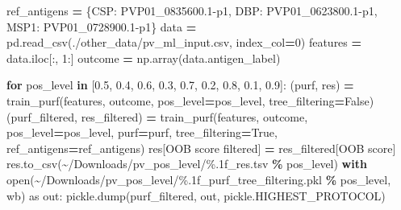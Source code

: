 \documentclass[
  11pt,
  oneside]{book}
\newenvironment{Shaded}{\begin{snugshade}}{\end{snugshade}}
\newcommand{\BuiltInTok}[1]{#1}
\newcommand{\ControlFlowTok}[1]{\textcolor[rgb]{0.13,0.29,0.53}{\textbf{#1}}}
\newcommand{\DecValTok}[1]{\textcolor[rgb]{0.00,0.00,0.81}{#1}}
\newcommand{\FloatTok}[1]{\textcolor[rgb]{0.00,0.00,0.81}{#1}}
\newcommand{\ImportTok}[1]{#1}
\newcommand{\KeywordTok}[1]{\textcolor[rgb]{0.13,0.29,0.53}{\textbf{#1}}}
\newcommand{\NormalTok}[1]{#1}
\newcommand{\OperatorTok}[1]{\textcolor[rgb]{0.81,0.36,0.00}{\textbf{#1}}}
\newcommand{\SpecialCharTok}[1]{\textcolor[rgb]{0.00,0.00,0.00}{#1}}
\newcommand{\StringTok}[1]{\textcolor[rgb]{0.31,0.60,0.02}{#1}}
\newcommand{\VariableTok}[1]{\textcolor[rgb]{0.00,0.00,0.00}{#1}}
\begin{document}
\begin{Shaded}
\begin{Highlighting}[]
\NormalTok{ref\_antigens }\OperatorTok{=}\NormalTok{ \{}\StringTok{\textquotesingle{}CSP\textquotesingle{}}\NormalTok{: }\StringTok{\textquotesingle{}PVP01\_0835600.1{-}p1\textquotesingle{}}\NormalTok{, }\StringTok{\textquotesingle{}DBP\textquotesingle{}}\NormalTok{: }\StringTok{\textquotesingle{}PVP01\_0623800.1{-}p1\textquotesingle{}}\NormalTok{, }\StringTok{\textquotesingle{}MSP1\textquotesingle{}}\NormalTok{: }\StringTok{\textquotesingle{}PVP01\_0728900.1{-}p1\textquotesingle{}}\NormalTok{\}}
\NormalTok{data }\OperatorTok{=}\NormalTok{ pd.read\_csv(}\StringTok{\textquotesingle{}./other\_data/pv\_ml\_input.csv\textquotesingle{}}\NormalTok{, index\_col}\OperatorTok{=}\DecValTok{0}\NormalTok{)}
\NormalTok{features }\OperatorTok{=}\NormalTok{ data.iloc[:, }\DecValTok{1}\NormalTok{:]}
\NormalTok{outcome }\OperatorTok{=}\NormalTok{ np.array(data.antigen\_label)}

\ControlFlowTok{for}\NormalTok{ pos\_level }\KeywordTok{in}\NormalTok{ [}\FloatTok{0.5}\NormalTok{, }\FloatTok{0.4}\NormalTok{, }\FloatTok{0.6}\NormalTok{, }\FloatTok{0.3}\NormalTok{, }\FloatTok{0.7}\NormalTok{, }\FloatTok{0.2}\NormalTok{, }\FloatTok{0.8}\NormalTok{, }\FloatTok{0.1}\NormalTok{, }\FloatTok{0.9}\NormalTok{]:}
\NormalTok{    (purf, res) }\OperatorTok{=}\NormalTok{ train\_purf(features, outcome, pos\_level}\OperatorTok{=}\NormalTok{pos\_level, tree\_filtering}\OperatorTok{=}\VariableTok{False}\NormalTok{)}
\NormalTok{    (purf\_filtered, res\_filtered) }\OperatorTok{=}\NormalTok{ train\_purf(features, outcome, pos\_level}\OperatorTok{=}\NormalTok{pos\_level, purf}\OperatorTok{=}\NormalTok{purf, tree\_filtering}\OperatorTok{=}\VariableTok{True}\NormalTok{, ref\_antigens}\OperatorTok{=}\NormalTok{ref\_antigens)}
\NormalTok{    res[}\StringTok{\textquotesingle{}OOB score filtered\textquotesingle{}}\NormalTok{] }\OperatorTok{=}\NormalTok{ res\_filtered[}\StringTok{\textquotesingle{}OOB score\textquotesingle{}}\NormalTok{]}
\NormalTok{    res.to\_csv(}\StringTok{\textquotesingle{}\textasciitilde{}/Downloads/pv\_pos\_level/}\SpecialCharTok{\%.1f}\StringTok{\_res.tsv\textquotesingle{}} \OperatorTok{\%}\NormalTok{ pos\_level)}
    \ControlFlowTok{with} \BuiltInTok{open}\NormalTok{(}\StringTok{\textquotesingle{}\textasciitilde{}/Downloads/pv\_pos\_level/}\SpecialCharTok{\%.1f}\StringTok{\_purf\_tree\_filtering.pkl\textquotesingle{}} \OperatorTok{\%}\NormalTok{ pos\_level, }\StringTok{\textquotesingle{}wb\textquotesingle{}}\NormalTok{) }\ImportTok{as}\NormalTok{ out:}
\NormalTok{        pickle.dump(purf\_filtered, out, pickle.HIGHEST\_PROTOCOL)}
\end{Highlighting}
\end{Shaded}
\end{document}
